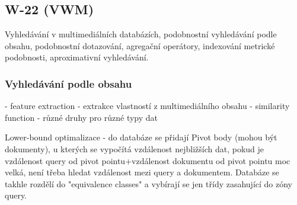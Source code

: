 \subsection{W-22 (VWM)}

Vyhledávání v multimediálních databázích, podobnostní vyhledávání podle obsahu, podobnostní dotazování, agregační operátory, indexování metrické podobnosti, aproximativní vyhledávání.

\subsubsection*{Vyhledávání podle obsahu}

- feature extraction - extrakce vlastností z multimediálního obsahu
- similarity function - různé druhy pro různé typy dat

Lower-bound optimalizace - do databáze se přidají Pivot body (mohou být dokumenty), u kterých se vypočítá vzdálenost nejbližších dat, pokud je vzdálenost query od pivot pointu+vzdálenost dokumentu od pivot pointu moc velká, není třeba hledat vzdálenost mezi query a dokumentem. Databáze se takhle rozdělí do "equivalence classes" a vybírají se jen třídy zasahující do zóny query.
